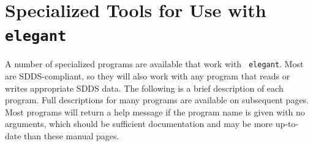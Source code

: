 \documentclass[11pt]{article}
\begin{document}



\newpage
\section{Specialized Tools for Use with {\tt elegant}\label{sect:tools}}

A number of specialized programs are available that work with {\tt
elegant}. Most are SDDS-compliant, so they will also work with any
program that reads or writes appropriate SDDS data.  The following is
a brief description of each program.  Full descriptions for many programs are available
on subsequent pages.  Most programs will return a help message if the program name is
given with no arguments, which should be sufficient documentation and may be more
up-to-date than these manual pages.
\end{document}
